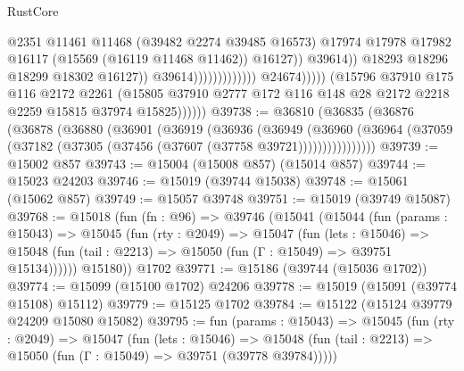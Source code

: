 \begin{lexlean}{RustCore}
\begin{coremodule}
                                                            @2351
                                                            @11461
                                                            @11468
                                                            (@39482 @2274 @39485 @16573)
                                                            @17974
                                                            @17978
                                                            @17982
                                                            @16117
                                                            (@15569 (@16119 @11468 @11462))
                                                            @16127))
                                                        @39614))
                                                    @18293
                                                    @18296
                                                    @18299
                                                    @18302
                                                    @16127))
                                                @39614)))))))))))))
                      @24674)))))
            (@15796
              @37910
              @175
              @116
              @2172
              @2261
              (@15805 @37910 @2777 @172 @116 @148 @28 @2172 @2218 @2259 @15815 @37974 @15825))))))
@39738 := @36810
    (@36835
      (@36876
        (@36878
          (@36880
            (@36901
              (@36919
                (@36936
                  (@36949
                    (@36960
                      (@36964 (@37059 (@37182 (@37305 (@37456 (@37607 (@37758 @39721))))))))))))))))
@39739 := @15002 @857
@39743 := @15004 (@15008 @857) (@15014 @857)
@39744 := @15023 @24203
@39746 := @15019 (@39744 @15038)
@39748 := @15061 (@15062 @857)
@39749 := @15057 @39748
@39751 := @15019 (@39749 @15087)
@39768 := @15018
    (fun (fn : @96) =>
    @39746
      (@15041
        (@15044
          (fun (params : @15043) =>
          @15045
            (fun (rty : @2049) =>
            @15047
              (fun (lets : @15046) =>
              @15048 (fun (tail : @2213) => @15050 (fun (Γ : @15049) => @39751 @15134))))))
        @15180))
    @1702
@39771 := @15186 (@39744 (@15036 @1702))
@39774 := @15099 (@15100 @1702) @24206
@39778 := @15019 (@15091 (@39774 @15108) @15112)
@39779 := @15125 @1702
@39784 := @15122 (@15124 @39779 @24209 @15080 @15082)
@39795 := fun (params : @15043) =>
  @15045
    (fun (rty : @2049) =>
    @15047
      (fun (lets : @15046) =>
      @15048 (fun (tail : @2213) => @15050 (fun (Γ : @15049) => @39751 (@39778 @39784)))))

\end{coremodule}
\end{lexlean}
